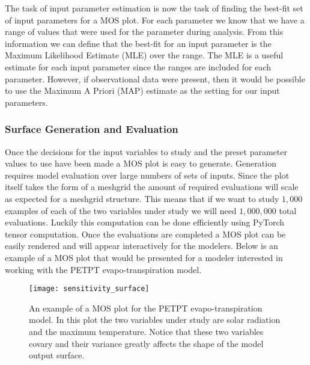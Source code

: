 The task of input parameter estimation is now the task of finding the best-fit set of input parameters for a MOS plot. For each parameter we know that we have a range of values that were used for the parameter during analysis. From this information we can define that the best-fit for an input parameter is the Maximum Likelihood Estimate (MLE) over the range. The MLE is a useful estimate for each input parameter since the ranges are included for each parameter. However, if observational data were present, then it would be possible to use the Maximum A Priori (MAP) estimate as the setting for our input parameters.

\subsubsection{Surface Generation and Evaluation\label{sec:surf_usage}}
Once the decisions for the input variables to study and the preset parameter values to use have been made a MOS plot is easy to generate.
Generation requires model evaluation over large numbers of sets of inputs.
Since the plot itself takes the form of a meshgrid the amount of required evaluations will scale as expected for a meshgrid structure.
This means that if we want to study $1,000$ examples of each of the two variables under study we will need $1,000,000$ total evaluations.
Luckily this computation can be done efficiently using PyTorch tensor computation.
Once the evaluations are completed a MOS plot can be easily rendered and will appear interactively for the modelers. Below is an example of a MOS plot that would be presented for a modeler interested in working with the PETPT evapo-transpiration model.

\FloatBarrier
\begin{figure}[!htbp]
    \label{mos_plot_ex}
    \centering
    \texttt{[image: sensitivity\_surface]}%
    \caption[PETPT Example MOS Plot]{An example of a MOS plot for the PETPT evapo-transpiration model. In this plot the two variables under study are solar radiation and the maximum temperature. Notice that these two variables covary and their variance greatly affects the shape of the model output surface.}
\end{figure}
\FloatBarrier


